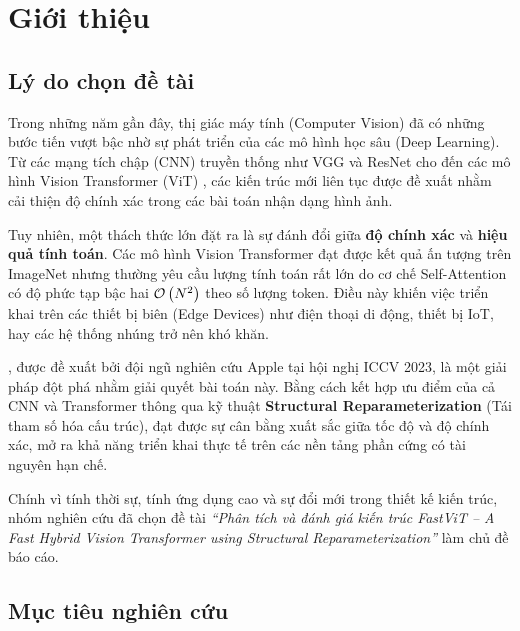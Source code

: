 \chapter{Giới thiệu}
\label{chap:introduction}

\section{Lý do chọn đề tài}
\label{sec:lydo}

Trong những năm gần đây, thị giác máy tính (Computer Vision) đã có những bước tiến vượt bậc nhờ sự phát triển của các mô hình học sâu (Deep Learning). Từ các mạng tích chập (CNN) truyền thống như VGG \cite{vgg2015} và ResNet \cite{resnet2016} cho đến các mô hình Vision Transformer (ViT) \cite{vit2021}, các kiến trúc mới liên tục được đề xuất nhằm cải thiện độ chính xác trong các bài toán nhận dạng hình ảnh.

Tuy nhiên, một thách thức lớn đặt ra là sự đánh đổi giữa \textbf{độ chính xác} và \textbf{hiệu quả tính toán}. Các mô hình Vision Transformer đạt được kết quả ấn tượng trên ImageNet \cite{imagenet2009} nhưng thường yêu cầu lượng tính toán rất lớn do cơ chế Self-Attention có độ phức tạp bậc hai $\mathcal{O}\left(N^2\right)$ theo số lượng token. Điều này khiến việc triển khai trên các thiết bị biên (Edge Devices) như điện thoại di động, thiết bị IoT, hay các hệ thống nhúng trở nên khó khăn.

\fastvit{} \cite{fastvit2023}, được đề xuất bởi đội ngũ nghiên cứu Apple tại hội nghị ICCV 2023, là một giải pháp đột phá nhằm giải quyết bài toán này. Bằng cách kết hợp ưu điểm của cả CNN và Transformer thông qua kỹ thuật \textbf{Structural Reparameterization} (Tái tham số hóa cấu trúc), \fastvit{} đạt được sự cân bằng xuất sắc giữa tốc độ và độ chính xác, mở ra khả năng triển khai thực tế trên các nền tảng phần cứng có tài nguyên hạn chế.

Chính vì tính thời sự, tính ứng dụng cao và sự đổi mới trong thiết kế kiến trúc, nhóm nghiên cứu đã chọn đề tài \textit{``Phân tích và đánh giá kiến trúc FastViT -- A Fast Hybrid Vision Transformer using Structural Reparameterization''} làm chủ đề báo cáo.

\section{Mục tiêu nghiên cứu}
\label{sec:muctieu}


